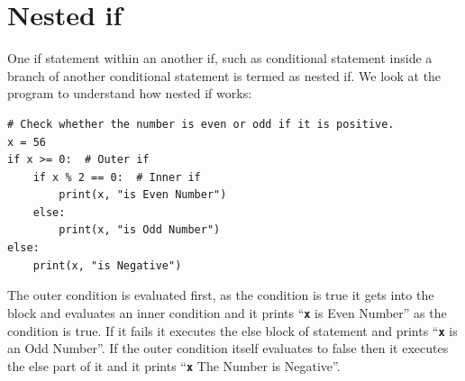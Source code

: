 \documentclass[11pt,a4paper]{article}
\newcommand{\Code}[1]{\textbf{\texttt{#1}}}
\begin{document}
\section*{Nested if}
One if statement within an another if, such as conditional statement inside a branch of another conditional statement is termed as nested if.
We look at the program to understand how nested if works:
\begin{verbatim}
# Check whether the number is even or odd if it is positive.
x = 56
if x >= 0:  # Outer if 
    if x % 2 == 0:  # Inner if
        print(x, "is Even Number")
    else:
        print(x, "is Odd Number")
else:
    print(x, "is Negative")
\end{verbatim}
The outer condition is evaluated first, as the condition is true it gets into the block and evaluates an inner condition and it prints ``\Code{x} is Even Number'' as the condition is true. If it fails it executes the else block of statement and prints ``\Code{x} is an Odd Number''. If the outer condition itself evaluates to false then it executes the else part of it and it prints ``\Code{x} The Number is Negative''.
\end{document}
